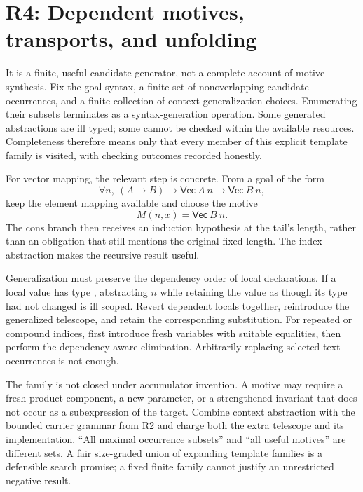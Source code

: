 \section{R4: Dependent motives, transports, and unfolding}\label{sec:dependent}


\answer It is a finite, useful candidate generator, not a complete account of motive synthesis. Fix the goal syntax, a finite set of nonoverlapping candidate occurrences, and a finite collection of context-generalization choices. Enumerating their subsets terminates as a syntax-generation operation. Some generated abstractions are ill typed; some cannot be checked within the available resources. Completeness therefore means only that every member of this explicit template family is visited, with checking outcomes recorded honestly.

For vector mapping, the relevant step is concrete. From a goal of the form
\[
 \forall n,\ (A\to B)\to\mathsf{Vec}\ A\ n\to\mathsf{Vec}\ B\ n,
\]
keep the element mapping available and choose the motive
\[
 M(n,x)=\mathsf{Vec}\ B\ n.
\]
The cons branch then receives an induction hypothesis at the tail's length, rather than an obligation that still mentions the original fixed length. The index abstraction makes the recursive result useful.

Generalization must preserve the dependency order of local declarations. If a local value has type , abstracting $n$ while retaining the value as though its type had not changed is ill scoped. Revert dependent locals together, reintroduce the generalized telescope, and retain the corresponding substitution. For repeated or compound indices, first introduce fresh variables with suitable equalities, then perform the dependency-aware elimination. Arbitrarily replacing selected text occurrences is not enough.

The family is not closed under accumulator invention. A motive may require a fresh product component, a new parameter, or a strengthened invariant that does not occur as a subexpression of the target. Combine context abstraction with the bounded carrier grammar from R2 and charge both the extra telescope and its implementation. ``All maximal occurrence subsets'' and ``all useful motives'' are different sets. A fair size-graded union of expanding template families is a defensible search promise; a fixed finite family cannot justify an unrestricted negative result.

